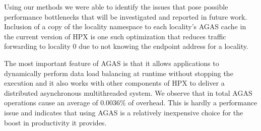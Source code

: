 Using our methods we were able to identify the issues that pose possible
performance bottlenecks that will be investigated and reported in future work. Inclusion of a copy
of the locality namespace to each locality's AGAS cache in the current version
of HPX is one such optimization that reduces traffic forwarding to locality 0
due to not knowing the endpoint address for a locality.

The most important feature of AGAS is that it allows applications to
dynamically perform data load balancing at runtime without stopping the
execution and it also works with other components of HPX to deliver a
distributed asynchronous multithreaded system. We observe that in total AGAS
operations cause an average of 0.0036\% of overhead. This is hardly a
performance issue and indicates that using AGAS is a relatively inexpensive
choice for the boost in productivity it provides.

